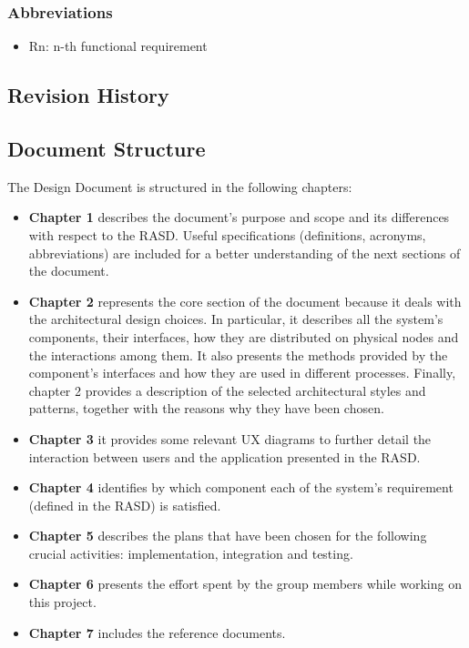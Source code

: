 \documentclass{article}
\begin{document}
\subsubsection{Abbreviations}
\begin{itemize}
\item Rn: n-th functional requirement
\end{itemize}
\subsection{Revision History}
\subsection{Document Structure}
The Design Document is structured in the following chapters:
\begin{itemize}
\item\textbf{Chapter 1} describes the document’s purpose and scope and its differences with respect to the RASD. Useful specifications (definitions, acronyms, abbreviations) are included for a better understanding of the next sections of the document.
\item\textbf{Chapter 2} represents the core section of the document because it deals with the architectural design choices. In particular, it describes all the system's components, their interfaces, how they are distributed on physical nodes and the interactions among them. It also presents the methods provided by the component's interfaces and how they are used in different processes. Finally, chapter 2 provides a description of the selected architectural styles and patterns, together with the reasons why they have been chosen.
\item\textbf{Chapter 3} it provides some relevant UX diagrams to further detail the interaction between users and the application presented in the RASD.
\item\textbf{Chapter 4} identifies by which component each of the system's requirement (defined in the RASD) is satisfied.
\item\textbf{Chapter 5} describes the plans that have been chosen for the following crucial activities: implementation, integration and testing.
\item\textbf{Chapter 6} presents the effort spent by the group members while working on this project.
\item\textbf{Chapter 7} includes the reference documents.
\end{itemize}
\end{document}
